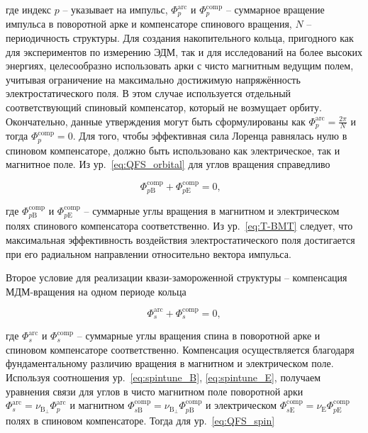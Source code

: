 \noindent где индекс $p$ -- указывает на импульс, $\Phi_p^{\textrm{arc}}$ и $\Phi_{p}^{\textrm{comp}}$ -- суммарное вращение импульса в поворотной арке и компенсаторе спинового вращения, $N$ -- периодичность структуры. Для создания накопительного кольца, пригодного как для экспериментов по измерению ЭДМ, так и для исследований на более высоких энергиях, целесообразно использовать арки с чисто магнитным ведущим полем, учитывая ограничение на максимально достижимую напряжённость электростатического поля. В этом случае используется отдельный соответствующий спиновый компенсатор, который не возмущает орбиту. Окончательно, данные утверждения могут быть сформулированы как $\Phi_p^{\textrm{arc}} = \frac{2\pi}{N}$ и тогда $\Phi_{p}^{\textrm{comp}} = 0$. Для того, чтобы эффективная сила Лоренца равнялась нулю в спиновом компенсаторе, должно быть использовано как электрическое, так и магнитное поле. Из ур.~\ref{eq:QFS_orbital} для углов вращения справедливо

\begin{equation}
	\Phi_{p\textrm{B}}^{\textrm{comp}}+{\Phi}_{p\textrm{E}}^{\textrm{comp}} = 0,\ \ \
	\label{eq:spin_comp}
\end{equation}

\noindent где $\Phi_{p\textrm{B}}^{\textrm{comp}}$ и ${\Phi}_{p\textrm{E}}^{\textrm{comp}}$ -- суммарные углы вращения в магнитном и электрическом полях спинового компенсатора соответственно. Из ур.~\ref{eq:T-BMT} следует, что максимальная эффективность воздействия электростатического поля достигается при его радиальном направлении относительно вектора импульса.

\par Второе условие для реализации квази-замороженной структуры -- компенсация МДМ-вращения на одном периоде кольца

\begin{equation}
	\Phi_s^{\textrm{arc}}+\Phi_{s}^{\textrm{comp}}=0,
	\label{eq:QFS_spin}
\end{equation}

\noindent где $\Phi_s^{\textrm{arc}}$ и $\Phi_{s}^{\textrm{comp}}$ -- суммарные углы вращения спина в поворотной арке и спиновом компенсаторе соответственно. Компенсация осуществляется благодаря фундаментальному различию вращения в магнитном и электрическом поле. Используя соотношения ур.~\ref{eq:spintune_B}, \ref{eq:spintune_E}, получаем уравнения связи для углов в чисто магнитном поле поворотной арки  $\Phi_{s}^{\text{arc}} = \nu_{\mathrm{B}_{\perp}}\Phi_{p}^{\text{arc}}$ и магнитном $\Phi_{s\mathrm{B}}^{\text{comp}} = \nu_{\mathrm{B}_{\perp}}\Phi_{p\mathrm{B}}^{\text{comp}}$ и электрическом $\Phi_{s\mathrm{E}}^{\text{comp}} = \nu_{\mathrm{E}}\Phi_{p\mathrm{E}}^{\text{comp}}$ полях в спиновом компенсаторе. Тогда для ур.~\ref{eq:QFS_spin}

